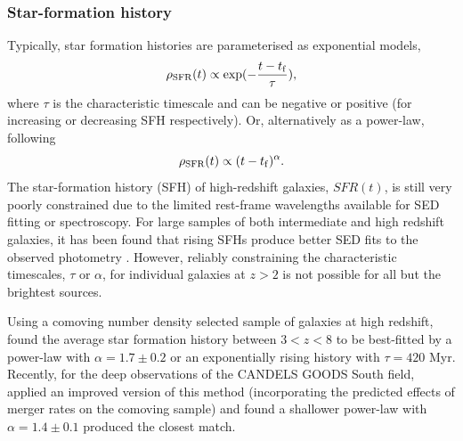 \subsubsection{Star-formation history}\label{sec:sfh}
Typically, star formation histories are parameterised as exponential models,
\begin{equation}
    \rho_{\rm{SFR}}(t) \propto \exp(-\frac{t - t_{\rm{f}}}{\tau}),
\end{equation}
where $\tau$ is the characteristic timescale and can be negative or positive (for increasing or decreasing SFH respectively). Or, alternatively as a power-law, following
\begin{equation}
    \rho_{\rm{SFR}}(t) \propto ({t - t_{\rm{f}}})^{\alpha}.
\end{equation}
The star-formation history (SFH) of high-redshift galaxies, $SFR(t)$, is still very poorly constrained due to the limited rest-frame wavelengths available for SED fitting or spectroscopy. For large samples of both intermediate and high redshift galaxies, it has been found that rising SFHs produce better SED fits to the observed photometry \citep{Maraston:2010dl,Lee:2014in}. However, reliably constraining the characteristic timescales, $\tau$ or $\alpha$, for individual galaxies at $z > 2$ is not possible for all but the brightest sources.

Using a comoving number density selected sample of galaxies at high redshift, \citet{2011MNRAS.412.1123P} found the average star formation history between $3 < z < 8$ to be best-fitted by a power-law with $\alpha = 1.7 \pm 0.2$ or an exponentially rising history with $\tau = 420$ Myr. Recently, for the deep observations of the CANDELS GOODS South field, \citet{Salmon:2014tm} applied an improved version of this method (incorporating the predicted effects of merger rates on the comoving sample) and found a shallower power-law with $\alpha = 1.4 \pm 0.1$ produced the closest match.

